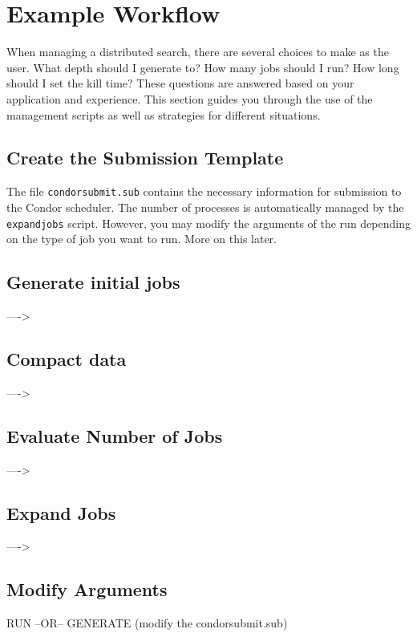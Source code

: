 \documentclass[11pt]{article}
\begin{document}
\section{Example Workflow}
\label{sec:workflow}

When managing a distributed search,
	there are several choices to make as the user.
What depth should I generate to?
How many jobs should I run?
How long should I set the kill time?
These questions are answered based on your application and
	experience.
This section guides you through the use of the management scripts
	as well as strategies for different situations.
	
\subsection{Create the Submission Template}

The file \texttt{condorsubmit.sub} contains the necessary information
	for submission to the Condor scheduler.
The number of processes is automatically managed by the \texttt{expandjobs} script.
However, you may modify the arguments of the run depending on the type of job 
	you want to run.
More on this later.

\subsection{Generate initial jobs}

---->

\subsection{Compact data}

---->

\subsection{Evaluate Number of Jobs}

---->

\subsection{Expand Jobs}

---->

\subsection{Modify Arguments}
RUN  --OR-- GENERATE (modify the condorsubmit.sub)
\end{document}

